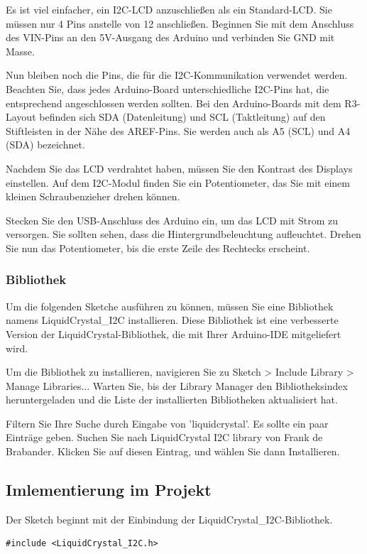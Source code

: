 \documentclass[conference]{IEEEtran}
\begin{document}
Es ist viel einfacher, ein I2C-LCD anzuschließen als ein Standard-LCD. Sie müssen nur 4 Pins anstelle von 12 anschließen. Beginnen Sie mit dem Anschluss des VIN-Pins an den 5V-Ausgang des Arduino und verbinden Sie GND mit Masse.

Nun bleiben noch die Pins, die für die I2C-Kommunikation verwendet werden. Beachten Sie, dass jedes Arduino-Board unterschiedliche I2C-Pins hat, die entsprechend angeschlossen werden sollten. Bei den Arduino-Boards mit dem R3-Layout befinden sich SDA (Datenleitung) und SCL (Taktleitung) auf den Stiftleisten in der Nähe des AREF-Pins. Sie werden auch als A5 (SCL) und A4 (SDA) bezeichnet.

Nachdem Sie das LCD verdrahtet haben, müssen Sie den Kontrast des Displays einstellen. Auf dem I2C-Modul finden Sie ein Potentiometer, das Sie mit einem kleinen Schraubenzieher drehen können.

Stecken Sie den USB-Anschluss des Arduino ein, um das LCD mit Strom zu versorgen. Sie sollten sehen, dass die Hintergrundbeleuchtung aufleuchtet. Drehen Sie nun das Potentiometer, bis die erste Zeile des Rechtecks erscheint.

\subsubsection{Bibliothek}
Um die folgenden Sketche ausführen zu können, müssen Sie eine Bibliothek namens LiquidCrystal\_I2C installieren. Diese Bibliothek ist eine verbesserte Version der LiquidCrystal-Bibliothek, die mit Ihrer Arduino-IDE mitgeliefert wird.

Um die Bibliothek zu installieren, navigieren Sie zu Sketch > Include Library > Manage Libraries... Warten Sie, bis der Library Manager den Bibliotheksindex heruntergeladen und die Liste der installierten Bibliotheken aktualisiert hat.

Filtern Sie Ihre Suche durch Eingabe von 'liquidcrystal'. Es sollte ein paar Einträge geben. Suchen Sie nach LiquidCrystal I2C library von Frank de Brabander. Klicken Sie auf diesen Eintrag, und wählen Sie dann Installieren.

\subsection{Imlementierung im Projekt}

Der Sketch beginnt mit der Einbindung der LiquidCrystal\_I2C-Bibliothek.
\begin{lstlisting}[style=CStyle]
#include <LiquidCrystal_I2C.h>
\end{lstlisting}\textbf{}
\end{document}
